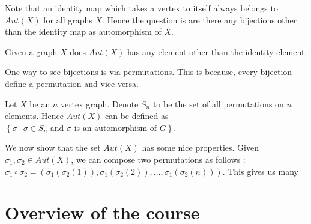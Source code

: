 Note that an identity map which takes a vertex to itself always belongs to
$Aut(X)$ for all graphs $X$. Hence the question is are there any bijections
other than the identity map as automorphism of $X$.

\begin{problem}
	Given a graph $X$ does $Aut(X)$ has any element other than the
	identity element.
\end{problem}

One way to see bijections is via permutations. This is because, every
bijection define a permutation and vice versa.

Let $X$ be an $n$ vertex graph. 
Denote $S_n$ to be the set of all permutations on $n$ elements. Hence $Aut(X)$
can be defined as $\left\{ \sigma ~|~ \sigma \in S_n \text{ and $\sigma$ is an
automorphism of } G\right\}$. 

We now show that the set $Aut(X)$ has some nice properties. Given $\sigma_1,
\sigma_2 \in Aut(X)$, we can compose two permutations as follows :$\sigma_1
\circ \sigma_2 = (\sigma_1(\sigma_2(1)),\sigma_1(\sigma_2(2)), \ldots,  
\sigma_1(\sigma_2(n)))$. This gives us many

\section{Overview of the course}


